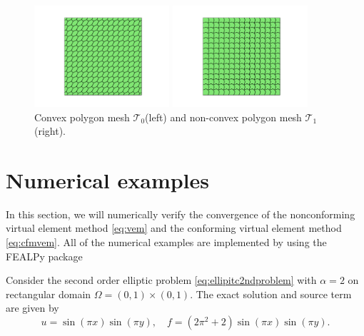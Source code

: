 \documentclass[10pt]{amsart}
\newtheorem{example}[theorem]{Example}
\numberwithin{equation}{section}
\begin{document}
\begin{figure}[htbp]
\centering
\begin{minipage}[t]{0.49\linewidth}
\centering
\includegraphics[width=5cm]{./figures/convex.pdf}
\end{minipage}%
\begin{minipage}[t]{0.49\linewidth}
\centering
\includegraphics[width=5cm]{./figures/nonconvex.pdf}
\end{minipage}%
\centering
\caption{Convex polygon mesh $\mathcal T_0$(left) and non-convex polygon mesh 
$\mathcal T_1$(right).}
\label{fig:mesh}
\end{figure}




\section{Numerical examples}\label{sec:numericalexamps}
In this section, we will numerically verify the convergence of the nonconforming virtual element method \eqref{eq:vem} and the conforming
virtual element method \eqref{eq:cfmvem}.
All of the numerical examples are implemented by using the FEALPy package \cite{fealpy}

Consider the second order elliptic problem \eqref{eq:ellipitc2ndproblem} with $\alpha = 2$
on rectangular domain $\Omega = (0, 1)\times(0, 1)$. 
The exact solution and source term are given by
$$
u = \sin(\pi x)\sin(\pi y), \quad f = (2\pi^2+2)\sin(\pi x)\sin(\pi y).
$$
\end{document}
